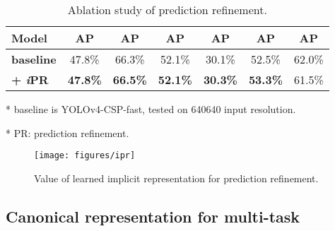 \documentclass[10pt,twocolumn,letterpaper]{article}
\begin{document}
\begin{table}[h]
	\centering
	\begin{threeparttable}[h]
		\footnotesize
		\caption{Ablation study of prediction refinement.}
		\label{table:e2}
		\setlength\tabcolsep{4.5pt}
		\begin{tabular}{lcccccc}
			\toprule
			\textbf{Model} & \textbf{AP} & \textbf{AP} & \textbf{AP} & \textbf{AP} & \textbf{AP} & \textbf{AP} \\				
			\midrule
			\textbf{baseline} & 47.8\% & 66.3\% & 52.1\% & 30.1\% & 52.5\% & 62.0\% \\
			\textbf{+ \textit{i}PR} & \textbf{47.8\%} & \textbf{66.5\%} & \textbf{52.1\%} & \textbf{30.3\%} & \textbf{53.3\%} & 61.5\% \\
			\bottomrule
		\end{tabular}
		\begin{tablenotes}[flushleft]
			\footnotesize
			\item[*] baseline is YOLOv4-CSP-fast, tested on 640640 input resolution.
			\item[*] PR: prediction refinement.
		\end{tablenotes}
	\end{threeparttable}
\end{table}

\begin{figure}[h]
\begin{center}
	\texttt{[image: figures/ipr]}
\end{center}
\caption{Value of learned implicit representation for prediction refinement.}
\label{fig:ipr}
\end{figure}

\newpage

\subsection{Canonical representation for multi-task}
\label{sec:mt}
\end{document}
